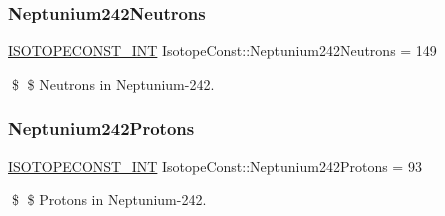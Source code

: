 \subsubsection{\texorpdfstring{Neptunium242\+Neutrons}{Neptunium242Neutrons}}
{\footnotesize\ttfamily \mbox{\hyperlink{group___isotope_const-_macros_ga5f18360b3e99483a35c32d789e62621c}{I\+S\+O\+T\+O\+P\+E\+C\+O\+N\+S\+T\+\_\+\+I\+NT}} Isotope\+Const\+::\+Neptunium242\+Neutrons = 149}

\$ \$ Neutrons in Neptunium-\/242. \mbox{\label{group___isotope_const-_neptunium-_np242_ga550df8c80fc702f4f4db70046c9e8d38}} 
\subsubsection{\texorpdfstring{Neptunium242\+Protons}{Neptunium242Protons}}
{\footnotesize\ttfamily \mbox{\hyperlink{group___isotope_const-_macros_ga5f18360b3e99483a35c32d789e62621c}{I\+S\+O\+T\+O\+P\+E\+C\+O\+N\+S\+T\+\_\+\+I\+NT}} Isotope\+Const\+::\+Neptunium242\+Protons = 93}

\$ \$ Protons in Neptunium-\/242. 